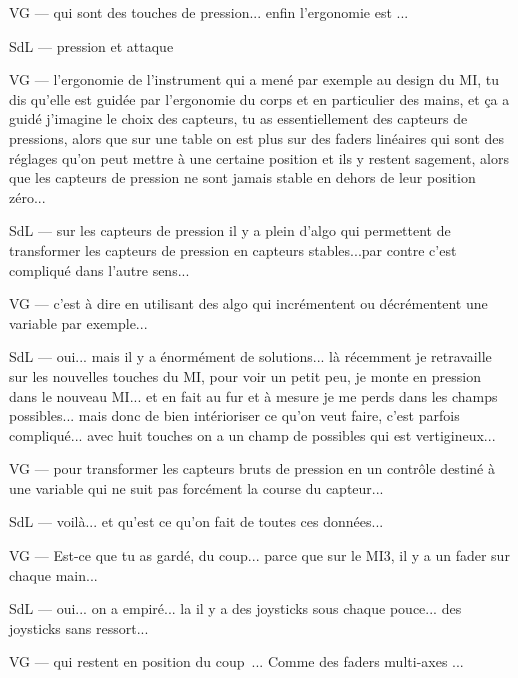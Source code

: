 VG — qui sont des touches de pression... enfin l'ergonomie est ... 

SdL — pression et attaque 

VG — l'ergonomie de l'instrument qui a mené par exemple au design du MI, tu dis qu'elle est guidée par l'ergonomie du corps et en particulier des mains, et ça a guidé j'imagine le choix des capteurs, tu as essentiellement des capteurs de pressions, alors que sur une table on est plus sur des faders linéaires qui sont des réglages qu'on peut mettre à une certaine position et ils y restent sagement, alors que les capteurs de pression ne sont jamais stable en dehors de leur position zéro...  

SdL — sur les capteurs de pression il y a plein d'algo qui permettent de transformer les capteurs de pression en capteurs stables...par contre c'est compliqué dans l'autre sens... 

VG — c'est à dire en utilisant des algo qui incrémentent ou décrémentent une variable par exemple... 

SdL — oui... mais il y a énormément de solutions... là récemment je retravaille sur les nouvelles touches du MI, pour voir un petit peu, je monte en pression dans le nouveau MI... et en fait au fur et à mesure je me perds dans les champs possibles...  mais donc de bien intérioriser ce qu'on veut faire, c'est parfois compliqué... avec huit touches on a un champ de possibles qui est vertigineux... 

VG — pour transformer les capteurs bruts de pression en un contrôle destiné à une variable qui ne suit pas forcément la course du capteur... 

SdL — voilà... et qu'est ce qu'on fait de toutes ces données... 

VG — Est-ce que tu as gardé, du coup... parce que sur le MI3, il y a un fader sur chaque main... 

SdL — oui... on a empiré... la il y a des joysticks sous chaque pouce... des joysticks sans ressort... 

VG — qui restent en position du coup ... Comme des faders multi-axes ... 

